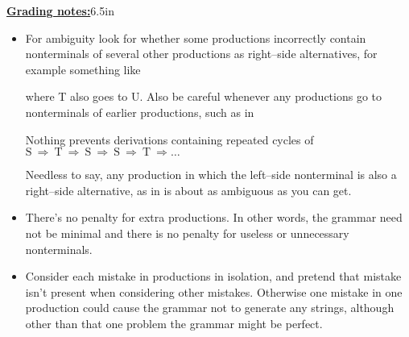 \documentclass[11pt,fleqn]{article}
\begin{document}
\begin{enumerate}
          \begin{info}{\textbf{\underline{Grading notes:}}}{6.5in}

            \begin{itemize}

              \addtolength{\itemsep}{1mm}

              \item For ambiguity look for whether some productions
                    incorrectly contain nonterminals of several other
                    productions as right--side alternatives, for example
                    something like


                    where T also goes to U.  Also be careful whenever any
                    productions go to nonterminals of earlier productions,
                    such as in

                    Nothing prevents derivations containing repeated
                    cycles of
                    \(
                      \mathrm{S} \: \Longrightarrow \:
                      \mathrm{T} \: \Longrightarrow \:
                      \mathrm{S} \: \Longrightarrow \:
                      \mathrm{S} \: \Longrightarrow \:
                      \mathrm{T} \: \Longrightarrow \ldots
                    \)

                    Needless to say, any production in which the left--side
                    nonterminal is also a right--side alternative, as in
                    is about as ambiguous as you can get.

              \item There's no penalty for extra productions.  In other words,
                    the grammar need not be minimal and there is no penalty
                    for useless or unnecessary nonterminals.

              \item Consider each mistake in productions in isolation, and
                    pretend that mistake isn't present when considering other
                    mistakes.  Otherwise one mistake in one production could
                    cause the grammar not to generate any strings, although
                    other than that one problem the grammar might be perfect.


\end{itemize}
\end{info}
\end{enumerate}
\end{document}
